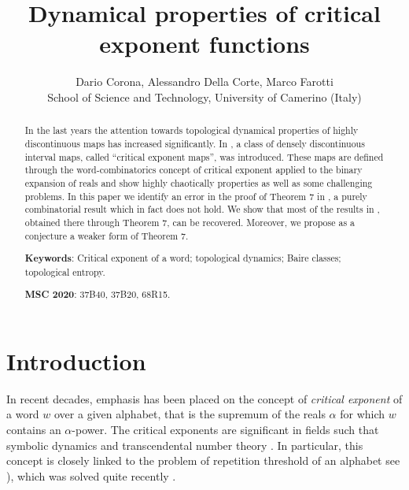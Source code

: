 \documentclass[12pt]{article}
\title{Dynamical properties of critical exponent functions
}
\author{Dario Corona, Alessandro Della Corte, Marco Farotti
	\\
	\small{School of Science and Technology,
University of Camerino (Italy)}}
\date{}
\theoremstyle{plain}\newtheorem{teo}{Theorem}
\theoremstyle{plain}\newtheorem{proposition}[teo]{Proposition}
\theoremstyle{plain}\newtheorem{lemma}[teo]{Lemma}
\theoremstyle{plain}\newtheorem{corollary}[teo]{Corollary}
\theoremstyle{plain}\newtheorem{conjecture}[teo]{Conjecture}
\theoremstyle{definition}\newtheorem{definition}[teo]{Definition}
\theoremstyle{remark}\newtheorem{remark}[teo]{Remark}
\theoremstyle{definition}\newtheorem{example}[teo]{Example}
\numberwithin{teo}{section}
\numberwithin{equation}{section}
\begin{document}
\maketitle



\begin{abstract}

In the last years the attention towards topological dynamical properties of highly discontinuous maps has increased significantly. In \cite{Critical}, a class of densely discontinuous interval maps, called ``critical exponent maps'', was introduced. These maps are defined through the word-combinatorics concept of critical exponent applied to the binary expansion of reals and show highly chaotically properties as well as some challenging problems. In this paper we identify an error in the proof of Theorem 7 in \cite{Critical}, a purely combinatorial result which in fact does not hold. We show that most of the results in \cite{Critical}, obtained there through Theorem 7, can be recovered. Moreover, we propose as a conjecture a weaker form of Theorem 7.
	
	\textbf{Keywords}: Critical exponent of a word; topological dynamics; Baire classes; topological entropy.
	

	\textbf{MSC 2020}: 37B40, 37B20, 68R15.
	

\end{abstract}
\section{Introduction}

In recent decades, emphasis has been placed on the concept of
\textit{critical exponent} of a word $w$ over a given alphabet, that is the
supremum of the reals $\alpha$ for which $w$ contains an $\alpha$-power.
The critical exponents are significant in fields such that symbolic dynamics and transcendental number theory \cite{adamczewski2007dynamics,adamczewski2010expansion}.
In particular, this concept is closely linked to the problem of repetition threshold of an alphabet see \cite[p. 126]{berstel2008combinatorics}), which was solved quite recently \cite{currie2011pr,queffelec2006old,Rao2011}.
\end{document}
